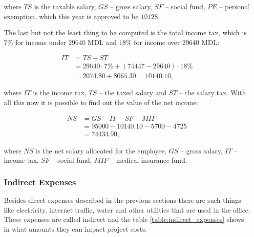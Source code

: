 \noindent where $TS$ is the taxable salary, $GS$ -- gross salary, $SF$ -- social
fund, $PE$ -- personal exemption, which this year is approved to be $10128$.

The last but not the least thing to be computed is the total income tax, which
is $7\%$ for income under 29640 MDL and $18\%$ for income over 29640 MDL:

\begin{equation}
\begin{split}
 IT &= TS - ST \\
      &= 29640 \cdot 7\% + (74447 - 29640) \cdot 18\% \\
      & = 2074.80 + 8065.30 = 10140.10,
 \end{split}
\end{equation}

\noindent where $IT$ is the income tax, $TS$ -- the taxed salary and $ST$ --
the salary tax. With all this now it is possible to find out the value of the
net income:

\begin{equation}
\begin{split}
 NS &= GS - IT - SF - MIF \\
            &= 95000 - 10140.10 - 5700 - 4725 \\
            &= 74434.90,
\end{split}
\end{equation}

\noindent where $NS$ is the net salary allocated for the employee, $GS$ -- gross salary, $IT$ -- income
tax, $SF$ -- social fund, $MIF$ -- medical insurance fund.


\subsubsection{Indirect Expenses}

Besides direct expenses described in the previous sections there are such
things like electricity, internet traffic, water and other utilities that are
used in the office. These expenses are called indirect and the table
\ref{table:indirect_expenses} shows in what amounts they can impact project
costs.

